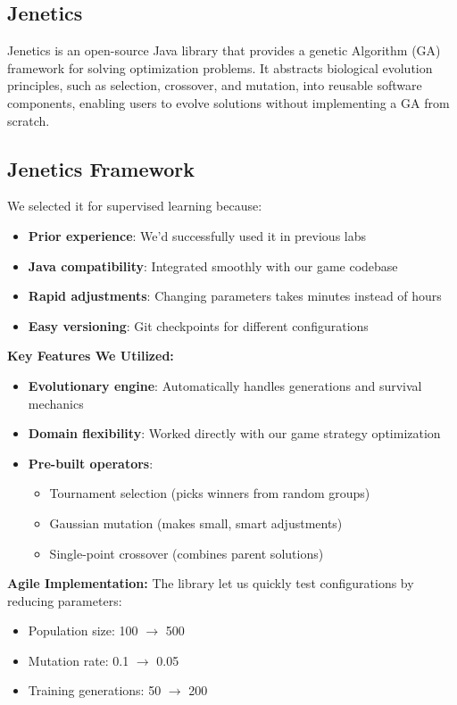 \documentclass[sigconf]{acmart} %
\begin{document}
\subsection{Jenetics}
Jenetics is an open-source Java library that provides a genetic Algorithm (GA) framework for solving optimization problems. It abstracts biological evolution principles, such as selection, crossover, and mutation, into reusable software components, enabling users to evolve solutions without implementing a GA from scratch. 
\subsection{Jenetics Framework}
\label{subsec:jenetics}

We selected it for supervised learning because:
\begin{itemize}
    \item \textbf{Prior experience}: We'd successfully used it in previous labs
    \item \textbf{Java compatibility}: Integrated smoothly with our game codebase
    \item \textbf{Rapid adjustments}: Changing parameters takes minutes instead of hours
    \item \textbf{Easy versioning}: Git checkpoints for different configurations
\end{itemize}

\textbf{Key Features We Utilized:}
\begin{itemize}
    \item \textbf{Evolutionary engine}: Automatically handles generations and survival mechanics
    \item \textbf{Domain flexibility}: Worked directly with our game strategy optimization
    \item \textbf{Pre-built operators}: 
    \begin{itemize}
        \item Tournament selection (picks winners from random groups)
        \item Gaussian mutation (makes small, smart adjustments)
        \item Single-point crossover (combines parent solutions)
    \end{itemize}
\end{itemize}

\textbf{Agile Implementation:}
The library let us quickly test configurations by reducing parameters:
\begin{itemize}
    \item Population size: 100 $\rightarrow$ 500 
    \item Mutation rate: 0.1 $\rightarrow$ 0.05 
    \item Training generations: 50 $\rightarrow$ 200 
\end{itemize}
\end{document}
